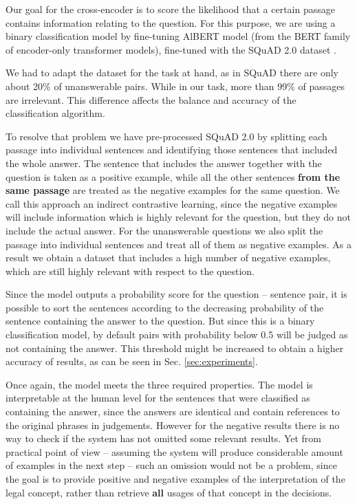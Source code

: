 Our goal for the cross-encoder is to score the likelihood that a certain passage contains information relating to the question.
For this purpose, we are using a binary classification model by fine-tuning AlBERT \cite{lan2019albert} model (from the BERT family
\cite{devlin2018bert} of encoder-only transformer models), fine-tuned with the SQuAD 2.0 dataset \cite{rajpurkar2018know}.

We had to adapt the dataset for the task at hand, as in SQuAD there are only about 20\% of unanswerable pairs. While in our task, more than 99\% of passages are irrelevant. This difference affects the balance and accuracy of the classification algorithm.

To resolve that problem we have pre-processed SQuAD 2.0 by splitting each passage into individual sentences and identifying
those sentences that included the whole answer. 
The sentence that includes the answer together with the question is taken as a positive example, while
all the other sentences \textbf{from the same passage} are treated as the negative examples for the same question.
We call this approach an indirect contrastive learning, since the negative examples will include information 
which is highly relevant for the question, but they do not include the actual answer. For the unanswerable questions
we also split the passage into individual sentences and treat all of them as negative examples. As a result we 
obtain a dataset that includes a high number of negative examples, which are still highly relevant with respect to the 
question.

Since the model outputs a probability score for the question -- sentence pair, it is possible to sort the sentences according
to the decreasing probability of the sentence containing the answer to the question. But since this is a binary classification
model, by default pairs with probability below 0.5 will be judged as not containing the answer. This threshold might be increased
to obtain a higher accuracy of results, as can be seen in Sec. \ref{sec:experiments}. 

Once again, the model meets the three required properties. The model is interpretable at the human level for the sentences that were classified as containing the answer, since the answers are identical and contain references to the original phrases in judgements.
However for the negative 
results there is no way to check if the system has not omitted some relevant results. Yet from practical point of view
-- assuming the system will produce considerable amount of examples in the next step -- such an 
omission would not be a problem, since the goal is to provide positive and negative examples of the interpretation of the
legal concept, rather than retrieve \textbf{all} usages of that concept in the decisions.


